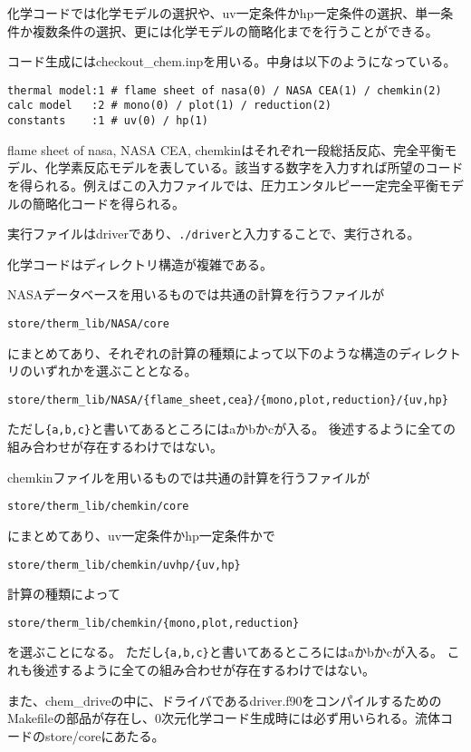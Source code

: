 \documentclass{jsarticle}
\begin{document}
化学コードでは化学モデルの選択や、uv一定条件かhp一定条件の選択、単一条件か複数条件の選択、更には化学モデルの簡略化までを行うことができる。

コード生成にはcheckout\_chem.inpを用いる。中身は以下のようになっている。
\begin{verbatim}
thermal model:1 # flame sheet of nasa(0) / NASA CEA(1) / chemkin(2)
calc model   :2 # mono(0) / plot(1) / reduction(2)
constants    :1 # uv(0) / hp(1)
\end{verbatim}
flame sheet of nasa, NASA CEA, chemkinはそれぞれ一段総括反応、完全平衡モデル、化学素反応モデルを表している。該当する数字を入力すれば所望のコードを得られる。例えばこの入力ファイルでは、圧力エンタルピー一定完全平衡モデルの簡略化コードを得られる。

実行ファイルはdriverであり、\verb|./driver|と入力することで、実行される。
\hspace{1em}

化学コードはディレクトリ構造が複雑である。

NASAデータベースを用いるものでは共通の計算を行うファイルが
\begin{verbatim}
store/therm_lib/NASA/core
\end{verbatim}
にまとめてあり、それぞれの計算の種類によって以下のような構造のディレクトリのいずれかを選ぶこととなる。
\begin{verbatim}
store/therm_lib/NASA/{flame_sheet,cea}/{mono,plot,reduction}/{uv,hp}
\end{verbatim}
ただし\verb|{a,b,c}|と書いてあるところにはaかbかcが入る。
後述するように全ての組み合わせが存在するわけではない。

chemkinファイルを用いるものでは共通の計算を行うファイルが
\begin{verbatim}
store/therm_lib/chemkin/core
\end{verbatim}
にまとめてあり、uv一定条件かhp一定条件かで
\begin{verbatim}
store/therm_lib/chemkin/uvhp/{uv,hp}
\end{verbatim}
計算の種類によって
\begin{verbatim}
store/therm_lib/chemkin/{mono,plot,reduction}
\end{verbatim}
を選ぶことになる。
ただし\verb|{a,b,c}|と書いてあるところにはaかbかcが入る。
これも後述するように全ての組み合わせが存在するわけではない。

また、chem\_driveの中に、ドライバであるdriver.f90をコンパイルするためのMakefileの部品が存在し、0次元化学コード生成時には必ず用いられる。流体コードのstore/coreにあたる。
\end{document}
